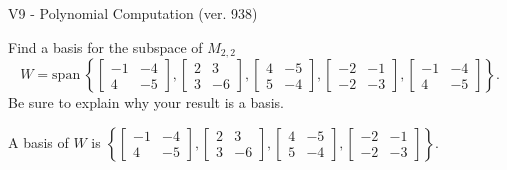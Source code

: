 \begin{exercise}
  \begin{exerciseTitle}V9 - Polynomial Computation (ver. 938)\end{exerciseTitle}
  \begin{exerciseStatement}
    Find a basis for the subspace of \(M_{2,2}\) 
\[W=\mathrm{span}\ \left\{\left[\begin{array}{cc}
-1 & -4 \\
4 & -5
\end{array}\right] , \left[\begin{array}{cc}
2 & 3 \\
3 & -6
\end{array}\right] , \left[\begin{array}{cc}
4 & -5 \\
5 & -4
\end{array}\right] , \left[\begin{array}{cc}
-2 & -1 \\
-2 & -3
\end{array}\right] , \left[\begin{array}{cc}
-1 & -4 \\
4 & -5
\end{array}\right]\right\}.\]
 Be sure to explain why your result is a basis.


  \end{exerciseStatement}
  \begin{exerciseAnswer}
   A basis of \(W\) is  \(\left\{\left[\begin{array}{cc}
-1 & -4 \\
4 & -5
\end{array}\right] , \left[\begin{array}{cc}
2 & 3 \\
3 & -6
\end{array}\right] , \left[\begin{array}{cc}
4 & -5 \\
5 & -4
\end{array}\right] , \left[\begin{array}{cc}
-2 & -1 \\
-2 & -3
\end{array}\right]\right\}\).
  


  \end{exerciseAnswer}
\end{exercise}